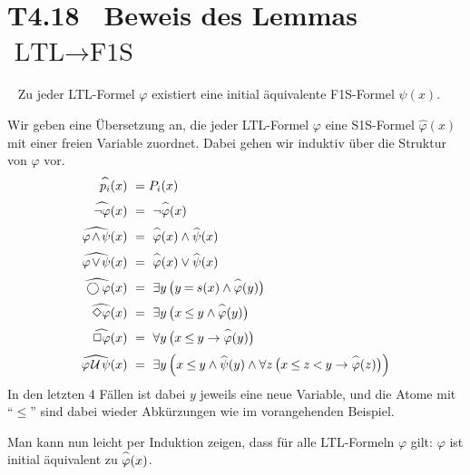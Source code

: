 \documentclass[fontsize=11pt, twoside=false, numbers=autoenddot]{scrbook}
\begin{document}
\section*{T4.18~ Beweis des Lemmas {\boldmath $\text{LTL} \to \text{F1S}$}}

~
Zu jeder LTL-Formel $\varphi$ existiert eine initial äquivalente
F1S-Formel $\psi(x)$.

\newcommand{\myhat}[1]{\widehat{\rule{0pt}{7pt}#1}}
\begin{beweis}
  Wir geben eine Übersetzung an, die jeder LTL-Formel $\varphi$
  eine S1S-Formel $\widehat{\varphi}(x)$ mit einer freien Variable
  zuordnet. Dabei gehen wir induktiv über die Struktur von $\varphi$ vor.
  \begin{align*}
    \myhat{p_i}(x)                          & ~= P_i(x)                                       \\[2pt]
    \myhat{\lnot\varphi}(x)                 & ~=~ \lnot\myhat{\varphi}(x)                     \\[2pt]
    \myhat{\varphi\!\!\:\land\!\!\:\psi}(x) & ~=~ \myhat{\varphi}(x) \land \myhat{\psi}(x)    \\[2pt]
    \myhat{\varphi\!\!\:\lor \!\!\:\psi}(x) & ~=~ \myhat{\varphi}(x) \lor  \myhat{\psi}(x)    \\[2pt]
    \myhat{\bigcirc\varphi}(x)              & ~=~ \exists y\,\big(y \!\!\;=\!\!\; s(x) \land \myhat{\varphi}(y)\big) \\[2pt]
    \myhat{\Diamond\varphi}(x)              & ~=~ \exists y\,\big(x \!\!\;\leq\!\!\; y \land \myhat{\varphi}(y)\big) \\[2pt]
    \myhat{\Box\varphi}(x)                  & ~=~ \forall y\,\big(x \!\!\;\leq\!\!\; y \to   \myhat{\varphi}(y)\big) \\[2pt]
    \myhat{\varphi\;\!\Umc\;\!\psi}(x)      & ~=~ \exists y\,\Big(x \!\!\;\leq\!\!\; y \land \myhat{\psi}(y)
                                                  \land \forall z\,\big(x \!\!\;\leq\!\!\; z \!\!\;<\!\!\; y \to \myhat{\varphi}(z)\big)\Big)
  \end{align*}
  In den letzten 4 Fällen ist dabei $y$ jeweils eine neue Variable,
  und die Atome mit "`$\leq$"' sind dabei wieder Abkürzungen wie im vorangehenden Beispiel.

  Man kann nun leicht per Induktion zeigen, dass für alle LTL-Formeln $\varphi$ gilt:
  $\varphi$ ist initial äquivalent zu $\myhat{\varphi}(x)$.
  \qedhere
\end{beweis}%
\end{document}
